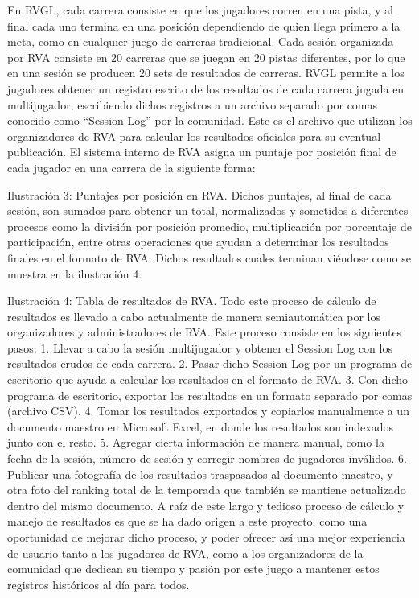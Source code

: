 En RVGL, cada carrera consiste en que los jugadores corren en una pista, y al final cada uno termina en una posición dependiendo de quien llega primero a la meta, como en cualquier juego de carreras tradicional. Cada sesión organizada por RVA consiste en 20 carreras que se juegan en 20 pistas diferentes, por lo que en una sesión se producen 20 sets de resultados de carreras. RVGL permite a los jugadores obtener un registro escrito de los resultados de cada carrera jugada en multijugador, escribiendo dichos registros a un archivo separado por comas conocido como “Session Log” por la comunidad. Este es el archivo que utilizan los organizadores de RVA para calcular los resultados oficiales para su eventual publicación.
El sistema interno de RVA asigna un puntaje por posición final de cada jugador en una carrera de la siguiente forma:

Ilustración 3: Puntajes por posición en RVA.
Dichos puntajes, al final de cada sesión, son sumados para obtener un total, normalizados y sometidos a diferentes procesos como la división por posición promedio, multiplicación por porcentaje de participación, entre otras operaciones que ayudan a determinar los resultados finales en el formato de RVA. Dichos resultados cuales terminan viéndose como se muestra en la ilustración 4.

Ilustración 4: Tabla de resultados de RVA.
Todo este proceso de cálculo de resultados es llevado a cabo actualmente de manera semiautomática por los organizadores y administradores de RVA. Este proceso consiste en los siguientes pasos:
1.	Llevar a cabo la sesión multijugador y obtener el Session Log con los resultados crudos de cada carrera.
2.	Pasar dicho Session Log por un programa de escritorio que ayuda a calcular los resultados en el formato de RVA.
3.	Con dicho programa de escritorio, exportar los resultados en un formato separado por comas (archivo CSV).
4.	Tomar los resultados exportados y copiarlos manualmente a un documento maestro en Microsoft Excel, en donde los resultados son indexados junto con el resto.
5.	Agregar cierta información de manera manual, como la fecha de la sesión, número de sesión y corregir nombres de jugadores inválidos.
6.	Publicar una fotografía de los resultados traspasados al documento maestro, y otra foto del ranking total de la temporada que también se mantiene actualizado dentro del mismo documento.
A raíz de este largo y tedioso proceso de cálculo y manejo de resultados es que se ha dado origen a este proyecto, como una oportunidad de mejorar dicho proceso, y poder ofrecer así una mejor experiencia de usuario tanto a los jugadores de RVA, como a los organizadores de la comunidad que dedican su tiempo y pasión por este juego a mantener estos registros históricos al día para todos.

